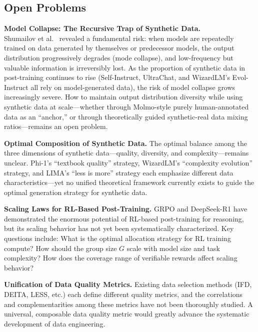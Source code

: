 \subsection{Open Problems}
\label{sec:t7-open}

\begin{openproblembox}
\textbf{Model Collapse: The Recursive Trap of Synthetic Data.}\\
Shumailov et al.\ \cite{shumailov2023modelcollapse} revealed a fundamental risk:
when models are repeatedly trained on data generated by themselves or predecessor models,
the output distribution progressively degrades (mode collapse),
and low-frequency but valuable information is irreversibly lost.
As the proportion of synthetic data in post-training continues to rise
(Self-Instruct, UltraChat, and WizardLM's Evol-Instruct all rely on model-generated data),
the risk of model collapse grows increasingly severe.
How to maintain output distribution diversity while using synthetic data at scale---whether through Molmo-style purely human-annotated data as an ``anchor,'' or through theoretically guided synthetic-real data mixing ratios---remains an open problem.
\end{openproblembox}

\begin{openproblembox}
\textbf{Optimal Composition of Synthetic Data.}
The optimal balance among the three dimensions of synthetic data---quality, diversity, and complexity---remains unclear.
Phi-1's ``textbook quality'' strategy, WizardLM's ``complexity evolution'' strategy, and LIMA's ``less is more'' strategy each emphasize different data characteristics---yet no unified theoretical framework currently exists to guide the optimal generation strategy for synthetic data.
\end{openproblembox}

\begin{openproblembox}
\textbf{Scaling Laws for RL-Based Post-Training.}
GRPO and DeepSeek-R1 have demonstrated the enormous potential of RL-based post-training for reasoning,
but its scaling behavior has not yet been systematically characterized.
Key questions include:
What is the optimal allocation strategy for RL training compute?
How should the group size $G$ scale with model size and task complexity?
How does the coverage range of verifiable rewards affect scaling behavior?
\end{openproblembox}

\begin{openproblembox}
\textbf{Unification of Data Quality Metrics.}
Existing data selection methods (IFD, DEITA, LESS, etc.) each define different quality metrics,
and the correlations and complementarities among these metrics have not been thoroughly studied.
A universal, composable data quality metric would greatly advance the systematic development of data engineering.
\end{openproblembox}

